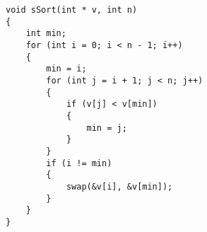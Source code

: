 \begin{lstlisting}[style=CStyle]
void sSort(int * v, int n)
{
    int min;
    for (int i = 0; i < n - 1; i++)
    {
        min = i;
        for (int j = i + 1; j < n; j++)
        {
            if (v[j] < v[min])
            {
                min = j;
            }
        }
        if (i != min)
        {
            swap(&v[i], &v[min]);
        }
    }
}
\end{lstlisting}